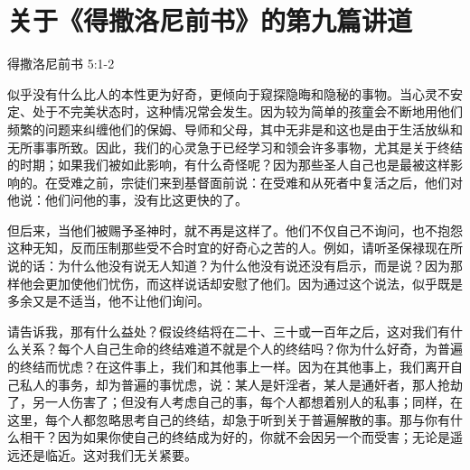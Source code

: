 

\section{关于《得撒洛尼前书》的第九篇讲道}

得撒洛尼前书 5:1-2\par

\par

似乎没有什么比人的本性更为好奇，更倾向于窥探隐晦和隐秘的事物。当心灵不安定、处于不完美状态时，这种情况常会发生。因为较为简单的孩童会不断地用他们频繁的问题来纠缠他们的保姆、导师和父母，其中无非是和这也是由于生活放纵和无所事事所致。因此，我们的心灵急于已经学习和领会许多事物，尤其是关于终结的时期；如果我们被如此影响，有什么奇怪呢？因为那些圣人自己也是最被这样影响的。在受难之前，宗徒们来到基督面前说：在受难和从死者中复活之后，他们对他说：他们问他的事，没有比这更快的了。\par

但后来，当他们被赐予圣神时，就不再是这样了。他们不仅自己不询问，也不抱怨这种无知，反而压制那些受不合时宜的好奇心之苦的人。例如，请听圣保禄现在所说的话：为什么他没有说无人知道？为什么他没有说还没有启示，而是说？因为那样他会更加使他们忧伤，而这样说话却安慰了他们。因为通过这个说法，似乎既是多余又是不适当，他不让他们询问。\par

请告诉我，那有什么益处？假设终结将在二十、三十或一百年之后，这对我们有什么关系？每个人自己生命的终结难道不就是个人的终结吗？你为什么好奇，为普遍的终结而忧虑？在这件事上，我们和其他事上一样。因为在其他事上，我们离开自己私人的事务，却为普遍的事忧虑，说：某人是奸淫者，某人是通奸者，那人抢劫了，另一人伤害了；但没有人考虑自己的事，每个人都想着别人的私事；同样，在这里，每个人都忽略思考自己的终结，却急于听到关于普遍解散的事。那与你有什么相干？因为如果你使自己的终结成为好的，你就不会因另一个而受害；无论是遥远还是临近。这对我们无关紧要。\par

